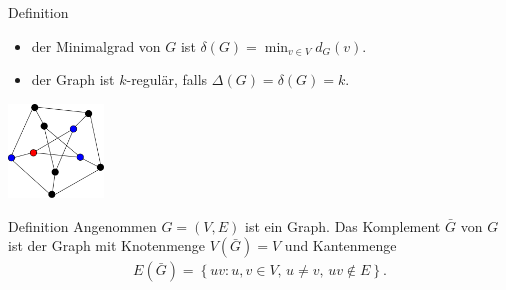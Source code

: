 \documentclass[aspectratio=1610, 11pt]{beamer}
\newcommand\cbc[1]{\left\{{#1}\right\}}
\begin{document}
\begin{frame}
\begin{overprint}
\begin{block}{Definition}
\begin{itemize}
			\item der \alert{Minimalgrad} von $G$ ist $\delta(G)=\min_{v\in V}d_G(v).$
			\item der Graph ist \alert{$k$-regul\"ar}, falls $\Delta(G)=\delta(G)=k$.
		\end{itemize}
	\end{block}
	\hfill\includegraphics[height=25mm]{images/petersen4.pdf}
	\begin{block}{Definition}
		Angenommen $G=(V,E)$ ist ein Graph. Das \alert{Komplement} $\bar G$ von $G$ ist der Graph mit Knotenmenge $V(\bar G)=V$ und Kantenmenge
		\begin{align*}
			E(\bar G)=\cbc{uv:u,v\in V,\,u\neq v,\,uv\not\in E}.
		\end{align*}
	\end{block}
	\end{overprint}
\end{frame}
\end{document}
